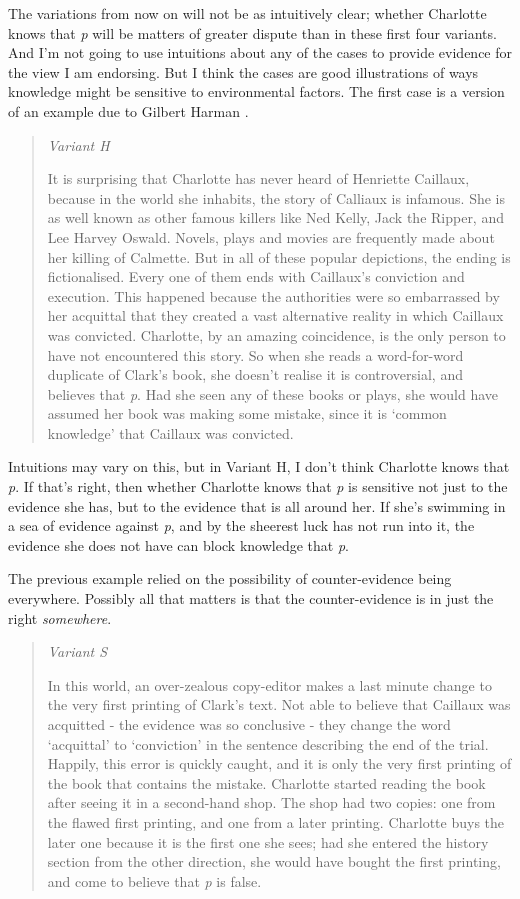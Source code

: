 \documentclass[
  11pt,
]{book}
\begin{document}
The variations from now on will not be as intuitively clear; whether Charlotte knows that \emph{p} will be matters of greater dispute than in these first four variants. And I'm not going to use intuitions about any of the cases to provide evidence for the view I am endorsing. But I think the cases are good illustrations of ways knowledge might be sensitive to environmental factors. The first case is a version of an example due to Gilbert Harman \citeyearpar[ 143ff]{Harman1973}.

\begin{quote}
\emph{Variant H}

It is surprising that Charlotte has never heard of Henriette Caillaux, because in the world she inhabits, the story of Calliaux is infamous. She is as well known as other famous killers like Ned Kelly, Jack the Ripper, and Lee Harvey Oswald. Novels, plays and movies are frequently made about her killing of Calmette. But in all of these popular depictions, the ending is fictionalised. Every one of them ends with Caillaux's conviction and execution. This happened because the authorities were so embarrassed by her acquittal that they created a vast alternative reality in which Caillaux was convicted. Charlotte, by an amazing coincidence, is the only person to have not encountered this story. So when she reads a word-for-word duplicate of Clark's book, she doesn't realise it is controversial, and believes that \emph{p}. Had she seen any of these books or plays, she would have assumed her book was making some mistake, since it is `common knowledge' that Caillaux was convicted.
\end{quote}

Intuitions may vary on this, but in Variant H, I don't think Charlotte knows that \emph{p}. If that's right, then whether Charlotte knows that \emph{p} is sensitive not just to the evidence she has, but to the evidence that is all around her. If she's swimming in a sea of evidence against \emph{p}, and by the sheerest luck has not run into it, the evidence she does not have can block knowledge that \emph{p}.

The previous example relied on the possibility of counter-evidence being everywhere. Possibly all that matters is that the counter-evidence is in just the right \emph{somewhere}.

\begin{quote}
\emph{Variant S}

In this world, an over-zealous copy-editor makes a last minute change to the very first printing of Clark's text. Not able to believe that Caillaux was acquitted - the evidence was so conclusive - they change the word `acquittal' to `conviction' in the sentence describing the end of the trial. Happily, this error is quickly caught, and it is only the very first printing of the book that contains the mistake. Charlotte started reading the book after seeing it in a second-hand shop. The shop had two copies: one from the flawed first printing, and one from a later printing. Charlotte buys the later one because it is the first one she sees; had she entered the history section from the other direction, she would have bought the first printing, and come to believe that \emph{p} is false.
\end{quote}
\end{document}
